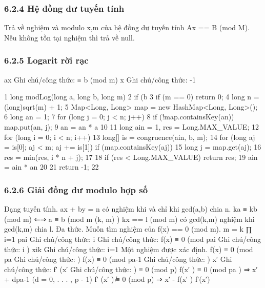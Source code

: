 \documentclass[11pt]{article}
\begin{document}
\subsubsection{6.2.4 Hệ đồng dư tuyến tính}
\begin{NoteBlock}
Trả về nghiệm và modulo {x,m} của hệ đồng dư tuyến tính Ax == B (mod M).
Nếu không tồn tại nghiệm thì trả về null.
\end{NoteBlock}
\subsubsection{6.2.5 Logarit rời rạc}
\begin{NoteBlock}
ax
Ghi chú/công thức: ≡ b (mod m)   x
Ghi chú/công thức: -1
\end{NoteBlock}
\begin{Code}
1 long modLog(long a, long b, long m) {
2 if (b %
3 if (m == 0) return 0;
4 long n = (long)sqrt(m) + 1;
5 Map<Long, Long> map = new HashMap<Long, Long>();
6 long an = 1;
7 for (long j = 0; j < n; j++) {
8 if (!map.containsKey(an)) map.put(an, j);
9 an = an * a %
10 }
11 long ain = 1, res = Long.MAX_VALUE;
12 for (long i = 0; i < n; i++) {
13 long[] is = congruence(ain, b, m);
14 for (long aj = is[0]; aj < m; aj += is[1]) if (map.containsKey(aj)) {
15 long j = map.get(aj);
16 res = min(res, i * n + j);
17 }
18 if (res < Long.MAX_VALUE) return res;
19 ain = ain * an %
20 }
21 return -1;
22 }
\end{Code}
\subsubsection{6.2.6 Giải đồng dư modulo hợp số}
\begin{NoteBlock}
Dạng tuyến tính.
ax + by = n có nghiệm khi và chỉ khi gcd(a,b) chia n.
ka ≡ kb (mod m) ⇐⇒ a ≡ b (mod
m
(k, m)
)
kx == l (mod m) có gcd(k,m) nghiệm khi gcd(k,m) chia l.
Đa thức.
Muốn tìm nghiệm của f(x) == 0 (mod m).
m =
k
∏
i=1
pai
Ghi chú/công thức: i
Ghi chú/công thức: f(x) ≡ 0 (mod pai
Ghi chú/công thức: i )   {xi}k
Ghi chú/công thức: i=1
Một nghiệm được xác định.
f(x) ≡ 0 (mod pa
Ghi chú/công thức: )
f(x) ≡ 0 (mod pa-1
Ghi chú/công thức: )   x′
Ghi chú/công thức: 
f′
(x′
Ghi chú/công thức: ) ≡ 0 (mod p)   f(x′
) ≡ 0 (mod pa
) ⇒ x′
+ dpa-1
(d = 0, . . . , p - 1)
f′
(x′
) ̸≡ 0 (mod p) ⇒ x′
-
f(x′
)
f′(x′)
\end{NoteBlock}
\end{document}
